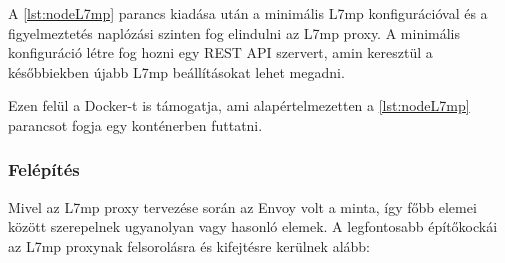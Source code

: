 A \ref{lst:nodeL7mp} parancs kiadása után a minimális L7mp konfigurációval és a 
figyelmeztetés naplózási szinten fog elindulni az L7mp proxy. A minimális konfiguráció 
létre fog hozni egy REST API szervert, amin keresztül a későbbiekben újabb L7mp 
beállításokat lehet megadni.

Ezen felül a Docker-t is támogatja, ami alapértelmezetten a \ref{lst:nodeL7mp} parancsot 
fogja egy konténerben futtatni.

\subsubsection{Felépítés}

Mivel az L7mp proxy tervezése során az Envoy volt a minta, így főbb elemei között 
szerepelnek ugyanolyan vagy hasonló elemek. A legfontosabb építőkockái az L7mp proxynak 
felsorolásra és kifejtésre kerülnek alább: 

